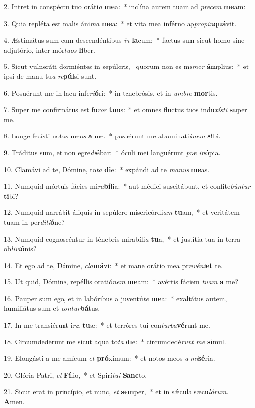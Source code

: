 2. Intret in conspéctu tuo oráti\textit{o} \textbf{me}a:~*  inclína aurem tuam ad \textit{pre}\textit{cem} \textbf{me}am:\

3. Quia repléta est malis áni\textit{ma} \textbf{me}a:~*  et vita mea inférno ap\textit{pro}\textit{pin}\textbf{quá}vit.\

4. Æstimátus sum cum descendéntibus \textit{in} \textbf{la}cum:~*  factus sum sicut homo sine adjutório, inter mór\textit{tu}\textit{os} \textbf{li}ber.\

5. Sicut vulneráti dormiéntes in sepúlcris, \dag\  quorum non es me\textit{mor} \textbf{ám}plius:~*  et ipsi de manu tu\textit{a} \textit{re}\textbf{púl}si sunt.\

6. Posuérunt me in lacu infe\textit{ri}\textbf{ó}ri:~*  in tenebrósis, et in \textit{um}\textit{bra} \textbf{mor}tis.\

7. Super me confirmátus est fu\textit{ror} \textbf{tu}us:~*  et omnes fluctus tuos indu\textit{xís}\textit{ti} \textbf{su}per me.\

8. Longe fecísti notos me\textit{os} \textbf{a} me:~*  posuérunt me abominati\textit{ó}\textit{nem} \textbf{si}bi.\

9. Tráditus sum, et non egre\textit{di}\textbf{é}bar:~*  óculi mei languérunt \textit{præ} \textit{in}\textbf{ó}pia.\

10. Clamávi ad te, Dómine, to\textit{ta} \textbf{di}e:~*  expándi ad te \textit{ma}\textit{nus} \textbf{me}as.\

11. Numquid mórtuis fácies mi\textit{ra}\textbf{bí}lia:~*  aut médici suscitábunt, et confite\textit{bún}\textit{tur} \textbf{ti}bi?\

12. Numquid narrábit áliquis in sepúlcro misericórdi\textit{am} \textbf{tu}am,~*  et veritátem tuam in per\textit{di}\textit{ti}\textbf{ó}ne?\

13. Numquid cognoscéntur in ténebris mirabíli\textit{a} \textbf{tu}a,~*  et justítia tua in terra ob\textit{li}\textit{vi}\textbf{ó}nis?\

14. Et ego ad te, Dómine, \textit{cla}\textbf{má}vi:~*  et mane orátio mea præ\textit{vé}\textit{ni}\textbf{et} te.\

15. Ut quid, Dómine, repéllis oratió\textit{nem} \textbf{me}am:~*  avértis fáciem \textit{tu}\textit{am} \textbf{a} me?\

16. Pauper sum ego, et in labóribus a juventú\textit{te} \textbf{me}a:~*  exaltátus autem, humiliátus sum et \textit{con}\textit{tur}\textbf{bá}tus.\

17. In me transiérunt i\textit{ræ} \textbf{tu}æ:~*  et terróres tui con\textit{tur}\textit{ba}\textbf{vé}runt me.\

18. Circumdedérunt me sicut aqua to\textit{ta} \textbf{di}e:~*  circumdedé\textit{runt} \textit{me} \textbf{si}mul.\

19. Elongásti a me amícum \textit{et} \textbf{pró}ximum:~*  et notos meos \textit{a} \textit{mi}\textbf{sé}ria.\

20. Glória Patri, \textit{et} \textbf{Fí}lio,~*  et Spirí\textit{tu}\textit{i} \textbf{Sanc}to.\

21. Sicut erat in princípio, et nunc, \textit{et} \textbf{sem}per,~*  et in sǽcula sæcu\textit{ló}\textit{rum}. \textbf{A}men.\

